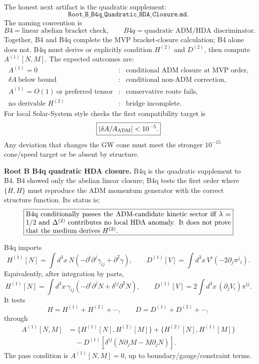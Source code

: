 \documentclass[11pt]{article}
\begin{document}
The honest next artifact is the quadratic supplement:
\[
\boxed{\texttt{Root\_B\_B4q\_Quadratic\_HDA\_Closure.md}.}
\]
The naming convention is
\[
\boxed{
B4=\text{linear abelian bracket check},\qquad
B4q=\text{quadratic ADM/HDA discriminator}.
}
\]
Together, B4 and B4q complete the MVP bracket-closure calculation; B4 alone
does not.  B4q must derive or explicitly condition \(H^{(2)}\) and \(D^{(2)}\),
then compute \(A^{(1)}[N,M]\).  The expected outcomes are:
\[
\boxed{
\begin{array}{lll}
A^{(1)}=0 &:& \text{conditional ADM closure at MVP order},\\
\delta A\ \text{below bound} &:& \text{conditional non-ADM correction},\\
A^{(1)}=O(1)\ \text{or preferred tensor} &:& \text{conservative route fails},\\
\text{no derivable }H^{(2)} &:& \text{bridge incomplete}.
\end{array}}
\]
For local Solar-System style checks the first compatibility target is
\[
\boxed{|\delta A/A_{\rm ADM}|<10^{-5}.}
\]
Any deviation that changes the GW cone must meet the stronger \(10^{-15}\)
cone/speed target or be absent by structure.

\medskip\noindent\textbf{Root B B4q quadratic HDA closure.}
B4q is the quadratic supplement to B4.  B4 showed only the abelian linear
closure; B4q tests the first order where \(\{H,H\}\) must reproduce the ADM
momentum generator with the correct structure function.  Its status is:
\[
\boxed{
\begin{minipage}{0.86\linewidth}
B4q conditionally passes the ADM-candidate kinetic sector iff
\(\lambda=1/2\) and \(\Delta^{(2)}\) contributes no local HDA anomaly.  It
does not prove that the medium derives \(H^{(2)}\).
\end{minipage}}
\]

B4q imports
\[
\boxed{
H^{(1)}[N]=\int d^3x\,N
(-\partial^i\partial^j\gamma_{ij}+\partial^2\gamma),
\qquad
D^{(1)}[V]=\int d^3x\,V^i(-2\partial_j\pi^j{}_i).
}
\]
Equivalently, after integration by parts,
\[
\boxed{
H^{(1)}[N]=\int d^3x\,\gamma_{ij}
(-\partial^i\partial^jN+\delta^{ij}\partial^2N),
\qquad
D^{(1)}[V]=2\int d^3x\,(\partial_jV_i)\pi^{ij}.
}
\]
It tests
\[
\boxed{
H=H^{(1)}+H^{(2)}+\cdots,\qquad
D=D^{(1)}+D^{(2)}+\cdots,
}
\]
through
\[
\boxed{
\begin{aligned}
A^{(1)}[N,M]
&=\{H^{(1)}[N],H^{(2)}[M]\}
+\{H^{(2)}[N],H^{(1)}[M]\}\\
&\quad
-D^{(1)}[\delta^{ij}(N\partial_jM-M\partial_jN)].
\end{aligned}}
\]
The pass condition is \(A^{(1)}[N,M]=0\), up to boundary/gauge/constraint
terms.
\end{document}
